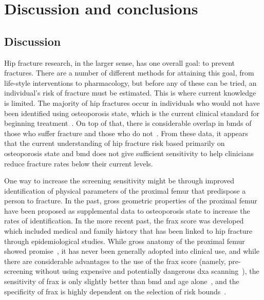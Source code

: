 
\chapter{Discussion and conclusions}
\label{ch:discussion}
\section{Discussion}
\label{sec:discussion_discussion}
Hip fracture research, in the larger sense, has one overall goal: to prevent fractures.
There are a number of different methods for attaining this goal, from life-style interventions to pharmacology, but before any of these can be tried, an individual's risk of fracture must be estimated.
This is where current knowledge is limited.
The majority of hip fractures occur in individuals who would not have been identified using osteoporosis state, which is the current clinical standard for beginning treatment~\citep{stone_bmd_2003}.
On top of that, there is considerable overlap in \acp{bmd} of those who suffer fracture and those who do not~\citep{greenspan_fall_1994}.
From these data, it appears that the current understanding of hip fracture risk based primarily on osteoporosis state and \ac{bmd} does not give sufficient sensitivity to help clinicians reduce fracture rates below their current levels.

One way to increase the screening sensitivity might be through improved identification of physical parameters of the proximal femur that predispose a person to fracture.
In the past, gross geometric properties of the proximal femur have been proposed as supplemental data to osteoporosis state to increase the rates of identification.
In the more recent past, the \ac{frax} score was developed which included medical and family history that has been linked to hip fracture through epidemiological studies.
While gross anatomy of the proximal femur showed promise~\citep{faulkner_simple_1993}, it has never been generally adopted into clinical use, and while there are considerable advantages to the use of the \ac{frax} score (namely, pre-screening without using expensive and potentially dangerous \ac{dxa} scanning~\citep{kanis_frax_2009}), the sensitivity of \ac{frax} is only slightly better than \ac{bmd} and age alone~\citep{van_den_bergh_assessment_2010}, and the specificity of \ac{frax} is highly dependent on the selection of risk bounds~\citep{leslie_fracture_2011}.

